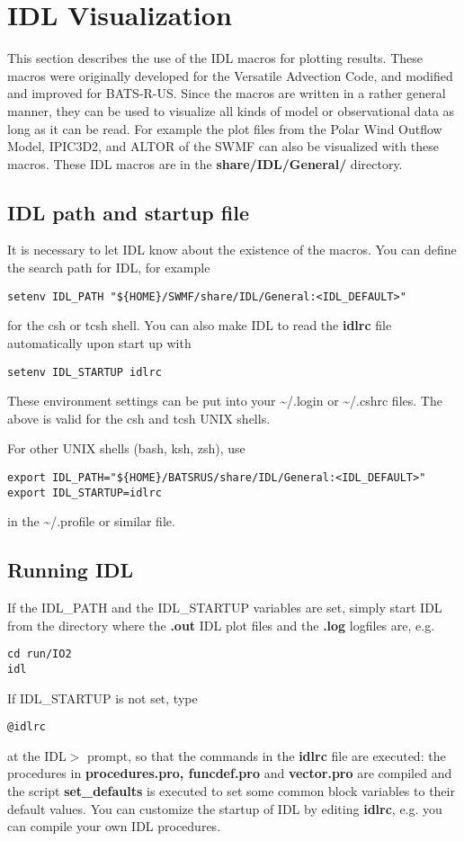 \documentclass{article}
\newcommand{\BATSRUS}{BATS-R-US}
\begin{document}
\section{IDL Visualization \label{section:idl_visualization}}

This section describes the use of the IDL macros for plotting results.
These macros were originally developed for the Versatile Advection Code,
and modified and improved for \BATSRUS. Since the macros are written
in a rather general manner, they can be used to visualize all kinds
of model or observational data as long as it can be read. For example
the plot files from the Polar Wind Outflow Model, IPIC3D2, and ALTOR
of the SWMF can also be visualized with these macros.
These IDL macros are in the {\bf share/IDL/General/} directory.

\subsection{IDL path and startup file \label{s-idl-path}}

   It is necessary to let IDL know about the existence of the macros.  
   You can define the search path for IDL, for example
\begin{verbatim}
setenv IDL_PATH "${HOME}/SWMF/share/IDL/General:<IDL_DEFAULT>"
\end{verbatim}
   for the csh or tcsh shell. You can also make IDL to read 
   the {\bf idlrc} file automatically upon start up with
\begin{verbatim}
setenv IDL_STARTUP idlrc
\end{verbatim}
   These environment settings can be put into your \~{}/.login or \~{}/.cshrc 
   files. The above is valid for the csh and tcsh UNIX shells. 

   For other UNIX shells (bash, ksh, zsh), use
\begin{verbatim}
export IDL_PATH="${HOME}/BATSRUS/share/IDL/General:<IDL_DEFAULT>"
export IDL_STARTUP=idlrc
\end{verbatim}
   in the \~{}/.profile or similar file.

\subsection{Running IDL \label{s-run-idl}}

   If the IDL\_PATH and the IDL\_STARTUP variables are set, simply 
   start IDL from the directory where the {\bf *.out} IDL plot files
   and the {\bf *.log} logfiles are, e.g.
\begin{verbatim}
cd run/IO2
idl
\end{verbatim}
   If IDL\_STARTUP is not set, type
\begin{verbatim}
@idlrc
\end{verbatim}
   at the IDL$>$ prompt, so that the commands in the {\bf idlrc} file are
   executed: 
   the procedures in {\bf procedures.pro, funcdef.pro} and 
   {\bf vector.pro} are compiled and 
   the script {\bf set\_defaults} is executed to set some
   common block variables to their default values. You can customize the startup
   of IDL by editing {\bf idlrc}, e.g. you can
   compile your own IDL procedures. 
\end{document}
